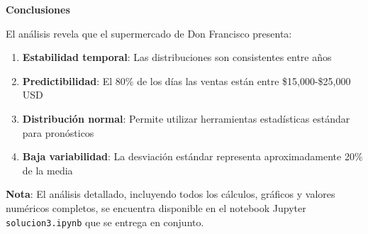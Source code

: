 \documentclass[11pt,a4paper]{article}
\begin{document}
\textbf{Conclusiones}

El análisis revela que el supermercado de Don Francisco presenta:
\begin{enumerate}
    \item \textbf{Estabilidad temporal}: Las distribuciones son consistentes entre años
    \item \textbf{Predictibilidad}: El 80\% de los días las ventas están entre \$15,000-\$25,000 USD
    \item \textbf{Distribución normal}: Permite utilizar herramientas estadísticas estándar para pronósticos
    \item \textbf{Baja variabilidad}: La desviación estándar representa aproximadamente 20\% de la media
\end{enumerate}

\textbf{Nota}: El análisis detallado, incluyendo todos los cálculos, gráficos y valores numéricos completos, se encuentra disponible en el notebook Jupyter \texttt{solucion3.ipynb} que se entrega en conjunto.
\end{document}
